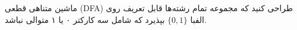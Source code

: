 ماشین متناهی قطعی 
(DFA)
طراحی کنید که مجموعه تمام رشته‌ها قابل تعریف روی الفبا
$\{0,1\}$
بپذیرد که شامل سه کارکتر ۰ یا ۱ متوالی نباشد.
